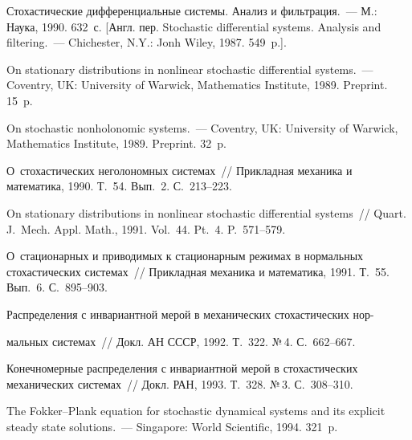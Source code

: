 \begin{multicols}{2}
{}

\vspace*{-8pt}


{\small\frenchspacing
{%
\begin{thebibliography}{99}

\vspace*{-4pt}

Стохастические дифференциальные системы. Анализ и фильтрация.~--- М.:
Наука,  1990.  632~с. [Англ. пер. Stochastic differential systems.
Analysis and filtering.~--- Chichester, N.Y.: Jonh Wiley, 1987.
549~p.].

On stationary distributions in nonlinear stochastic differential systems.~---
Coventry, UK: University of Warwick, Mathematics Institute, 1989. Preprint. 15~p.

 On stochastic nonholonomic systems.~---
Coventry, UK: University of Warwick, Mathematics Institute,
1989. Preprint. 32~p.

О~стохастических неголономных системах~// Прикладная механика и математика, 1990.
Т.~54. Вып.~2. С.~213--223.

On stationary distributions in nonlinear stochastic differential systems~//
Quart. J.~Mech. Appl. Math., 1991. Vol.~44.  Pt.~4.  P.~571--579.

 О~стационарных и приводимых к стационарным
режимах в нормальных стохастических системах~// Прикладная механика и математика,
1991. Т.~55. Вып.~6. С.~895--903.

Распределения с инвариантной мерой в механических стохастических нор-\linebreak\vspace*{-12pt}

\columnbreak

\noindent
мальных
системах~// Докл. АН СССР, 1992. Т.~322. №\,4. С.~662--667.

 Конечномерные распределения с инвариантной мерой в
стохастических механических системах~// Докл. РАН, 1993. Т.~328. №\,3. С.~308--310.

 The Fokker--Plank equation for stochastic dynamical
systems and its explicit steady state solutions.~--- Singapore: World Scientific,
1994. 321~p.


\end{thebibliography}}}
\end{multicols}

